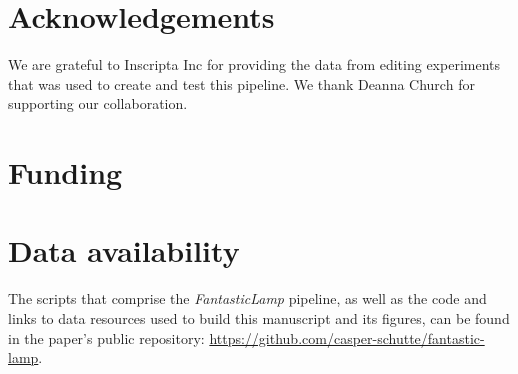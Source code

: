 \documentclass{bioinfo}
\theoremstyle{definition}
\begin{document}

\section*{Acknowledgements}
We are grateful to Inscripta Inc for providing the data from editing experiments that was used to create and test this pipeline. We thank Deanna Church for supporting our collaboration.

\section*{Funding}

\section*{Data availability}
The scripts that comprise the \textit{FantasticLamp} pipeline, as well as the code and links to data resources used to build this manuscript and its figures, can be found in the paper's public repository: \url{https://github.com/casper-schutte/fantastic-lamp}.




\end{document}
